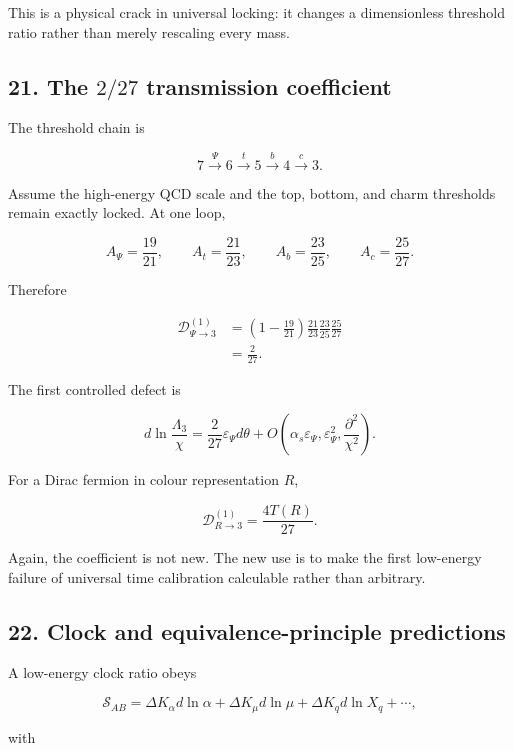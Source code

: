 \documentclass[
]{article}
\begin{document}
This is a physical crack in universal locking: it changes a
dimensionless threshold ratio rather than merely rescaling every mass.

\subsection{\texorpdfstring{21. The \(2/27\) transmission
coefficient}{21. The 2/27 transmission coefficient}}\label{the-227-transmission-coefficient}

The threshold chain is

\[
7\xrightarrow{\Psi}6\xrightarrow{t}5\xrightarrow{b}4\xrightarrow{c}3.
\]

Assume the high-energy QCD scale and the top, bottom, and charm
thresholds remain exactly locked. At one loop,

\[
A_\Psi=\frac{19}{21},
\qquad
A_t=\frac{21}{23},
\qquad
A_b=\frac{23}{25},
\qquad
A_c=\frac{25}{27}.
\]

Therefore

\[
\begin{aligned}
\mathcal D_{\Psi\to3}^{(1)}
&=\left(1-\frac{19}{21}\right)
\frac{21}{23}\frac{23}{25}\frac{25}{27}\\
&=\boxed{\frac{2}{27}}.
\end{aligned}
\]

The first controlled defect is

\[
\boxed{
 d\ln\frac{\Lambda_3}{\chi}
 =\frac{2}{27}\varepsilon_\Psi d\theta
 +O\left(\alpha_s\varepsilon_\Psi,
 \varepsilon_\Psi^2,
 \frac{\partial^2}{\chi^2}\right).
}
\]

For a Dirac fermion in colour representation \(R\),

\[
\mathcal D_{R\to3}^{(1)}=\frac{4T(R)}{27}.
\]

Again, the coefficient is not new. The new use is to make the first
low-energy failure of universal time calibration calculable rather than
arbitrary.

\subsection{22. Clock and equivalence-principle
predictions}\label{clock-and-equivalence-principle-predictions}

A low-energy clock ratio obeys

\[
\mathcal S_{AB}
=\Delta K_\alpha d\ln\alpha
+\Delta K_\mu d\ln\mu
+\Delta K_q d\ln X_q+\cdots,
\]

with
\end{document}
